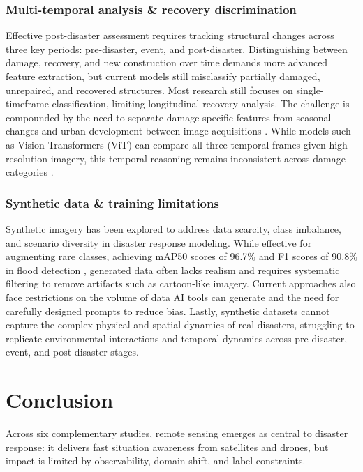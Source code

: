 \documentclass[conference,a4paper]{IEEEtran}
\begin{document}
\subsubsection{\textbf{Multi-temporal analysis \& recovery discrimination}}
Effective post-disaster assessment requires tracking structural changes across three key periods: pre-disaster, event, and post-disaster. Distinguishing between damage, recovery, and new construction over time demands more advanced feature extraction, but current models still misclassify partially damaged, unrepaired, and recovered structures. Most research still focuses on single-timeframe classification, limiting longitudinal recovery analysis. The challenge is compounded by the need to separate damage-specific features from seasonal changes and urban development between image acquisitions \cite{kimDisasterAssessmentUsing2022}. While models such as Vision Transformers (ViT) can compare all three temporal frames given high-resolution imagery, this temporal reasoning remains inconsistent across damage categories \cite{lagapEnhancingPostDisasterDamage2025}.

\subsubsection{\textbf{Synthetic data \& training limitations}}
Synthetic imagery has been explored to address data scarcity, class imbalance, and scenario diversity in disaster response modeling. While effective for augmenting rare classes, achieving mAP50 scores of 96.7\% and F1 scores of 90.8\% in flood detection \cite{teohExploringGenerativeAI2024}, generated data often lacks realism and requires systematic filtering to remove artifacts such as cartoon-like imagery. Current approaches also face restrictions on the volume of data AI tools can generate and the need for carefully designed prompts to reduce bias. Lastly, synthetic datasets cannot capture the complex physical and spatial dynamics of real disasters, struggling to replicate environmental interactions and temporal dynamics across pre-disaster, event, and post-disaster stages.


\section{Conclusion}
Across six complementary studies, remote sensing emerges as central to disaster response: it delivers fast situation awareness from satellites and drones, but impact is limited by observability, domain shift, and label constraints.
\end{document}
